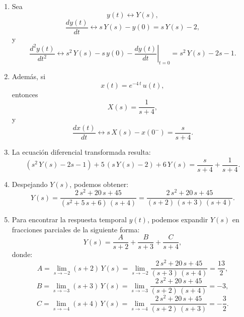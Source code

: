 \begin{enumerate}
	\item Sea \begin{equation}y(t) \leftrightarrow Y(s),\end{equation}
	\begin{equation}\frac{dy(t)}{dt} \leftrightarrow s \, Y(s) - y(0) = s \, Y(s) - 2,\end{equation}
	y \begin{equation}
		\frac{d^{2}y(t)}{dt^{2}} \leftrightarrow s^{2} \, Y(s) - s \, y(0) - \left. \frac{dy(t)}{dt}\right|_{t=0} = s^{2} \, Y(s) - 2s - 1.
	\end{equation}
	
	\item Además, si \begin{equation}x(t) = e^{-4 \, t} \, u(t),\end{equation} entonces \begin{equation}X(s) = \frac{1}{s + 4},\end{equation}
	y \begin{equation}\frac{dx(t)}{dt} \leftrightarrow s \, X(s) - x(0^{-}) = \frac{s}{s+4}.\end{equation} 
	
	\item La ecuación diferencial transformada resulta:
	\begin{equation}
		(s^{2} \, Y(s) - 2s - 1) + 5 \, (s \, Y(s) - 2) + 6 \, Y(s) = \frac{s}{s+4} + \frac{1}{s+4}.
	\end{equation}
	
	\item Despejando $Y(s)$, podemos obtener:
	\begin{equation}
		Y(s) = \frac{2 \, s^{2} + 20 \, s + 45}{(s^{2} + 5 \, s + 6) \, (s + 4)} = \frac{2 \, s^{2} + 20 \, s + 45}{(s + 2) \, (s + 3) \, (s + 4)}.
	\end{equation}
	
	\item Para encontrar la respuesta temporal $y(t)$, podemos expandir $Y(s)$ en fracciones parciales de la siguiente forma:
	\begin{equation}
		Y(s) = \frac{A}{s+2} + \frac{B}{s+3} + \frac{C}{s+4},
	\end{equation}
	donde:
	\begin{equation}
		A = \lim_{s \to -2} (s + 2) \, Y(s) = \lim_{s \to -2} \frac{2 \, s^{2} + 20 \, s + 45}{(s + 3) \, (s + 4)} = \frac{13}{2}, 
	\end{equation}
	\begin{equation}
		B = \lim_{s \to -3} (s + 3) \, Y(s) = \lim_{s \to -3} \frac{2 \, s^{2} + 20 \, s + 45}{(s + 2) \, (s + 4)} = -3, 
	\end{equation}
	\begin{equation}
		C = \lim_{s \to -4} (s + 4) \, Y(s) = \lim_{s \to -4} \frac{2 \, s^{2} + 20 \, s + 45}{(s + 2) \, (s + 3)} = -\frac{3}{2}.
	\end{equation}
	

\end{enumerate}
